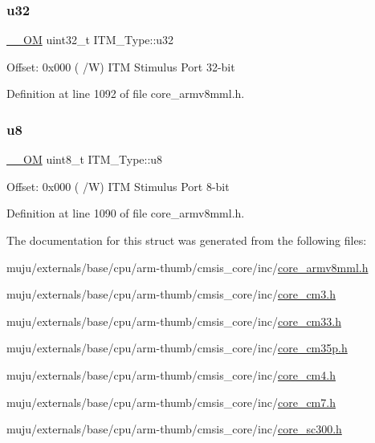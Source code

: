 \subsubsection{\texorpdfstring{u32}{u32}}
{\footnotesize\ttfamily \hyperlink{core__sc300_8h_a0ea2009ed8fd9ef35b48708280fdb758}{\+\_\+\+\_\+\+OM} uint32\+\_\+t I\+T\+M\+\_\+\+Type\+::u32}

Offset\+: 0x000 ( /W) I\+TM Stimulus Port 32-\/bit 

Definition at line 1092 of file core\+\_\+armv8mml.\+h.

\mbox{\label{struct_i_t_m___type_ae773bf9f9dac64e6c28b14aa39f74275}} 
\subsubsection{\texorpdfstring{u8}{u8}}
{\footnotesize\ttfamily \hyperlink{core__sc300_8h_a0ea2009ed8fd9ef35b48708280fdb758}{\+\_\+\+\_\+\+OM} uint8\+\_\+t I\+T\+M\+\_\+\+Type\+::u8}

Offset\+: 0x000 ( /W) I\+TM Stimulus Port 8-\/bit 

Definition at line 1090 of file core\+\_\+armv8mml.\+h.



The documentation for this struct was generated from the following files\+:\begin{DoxyCompactItemize}
\item 
muju/externals/base/cpu/arm-\/thumb/cmsis\+\_\+core/inc/\hyperlink{core__armv8mml_8h}{core\+\_\+armv8mml.\+h}\item 
muju/externals/base/cpu/arm-\/thumb/cmsis\+\_\+core/inc/\hyperlink{core__cm3_8h}{core\+\_\+cm3.\+h}\item 
muju/externals/base/cpu/arm-\/thumb/cmsis\+\_\+core/inc/\hyperlink{core__cm33_8h}{core\+\_\+cm33.\+h}\item 
muju/externals/base/cpu/arm-\/thumb/cmsis\+\_\+core/inc/\hyperlink{core__cm35p_8h}{core\+\_\+cm35p.\+h}\item 
muju/externals/base/cpu/arm-\/thumb/cmsis\+\_\+core/inc/\hyperlink{core__cm4_8h}{core\+\_\+cm4.\+h}\item 
muju/externals/base/cpu/arm-\/thumb/cmsis\+\_\+core/inc/\hyperlink{core__cm7_8h}{core\+\_\+cm7.\+h}\item 
muju/externals/base/cpu/arm-\/thumb/cmsis\+\_\+core/inc/\hyperlink{core__sc300_8h}{core\+\_\+sc300.\+h}\end{DoxyCompactItemize}
